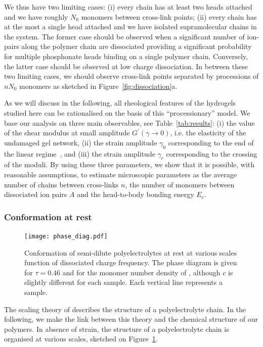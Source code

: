 \documentclass[journal=jacsat,manuscript=article]{achemso}
\begin{document}
We thus have two limiting cases: (i) every chain has at least two heads attached and we have roughly $N_0$ monomers between cross-link points; (ii) every chain has at the most a single head attached and we have isolated supramolecular chains in the system. The former case should be observed when a significant number of ion-pairs along the polymer chain are dissociated providing a significant probability for multiple phosphonate heads binding on a single polymer chain. Conversely, the latter case should be observed at low charge dissociation. In between these two limiting cases, we should observe cross-link points separated by processions of $n N_0$ monomers as sketched in Figure~\ref{fig:dissociation}a.

As we will discuss in the following, all rheological features of the hydrogels studied here can  be rationalised on the basis of this ``processionary'' model. We base our analysis on three main observables, see Table~\ref{tab:results}: (i) the value of the shear modulus at small amplitude $G^\prime(\gamma\rightarrow 0)$, i.e. the elasticity of the undamaged gel network, (ii) the strain amplitude $\gamma_0$ corresponding to the end of the linear regime~\cite{Hyun2011}, and (iii) the strain amplitude $\gamma_c$ corresponding to the crossing of the moduli. By using these three parameters, we show that it is possible, with reasonable assumptions, to estimate microscopic parameters as the average number of chains between cross-links $n$, the number of monomers between dissociated ion pairs $A$ and the head-to-body bonding energy $E_c$.


\subsubsection{Conformation at rest}
\begin{figure}
\texttt{[image: phase\_diag.pdf]}
\caption{Conformation of semi-dilute polyelectrolytes at rest at various scales function of dissociated charge frequency. The phase diagram is given for $\tau=0.46$ and for the monomer number density of , although $c$ is slightly different for each sample. Each vertical line represents a sample.}
\label{fig:phasediag}
\end{figure}

The scaling theory of \citet{Rubinstein1996} describes the structure of a polyelectrolyte chain. In the following, we make the link between this theory and the chemical structure of our polymers. In absence of strain, the structure of a polyelectrolyte chain is organised at various scales, sketched on Figure~\ref{fig:phasediag}.
\end{document}

